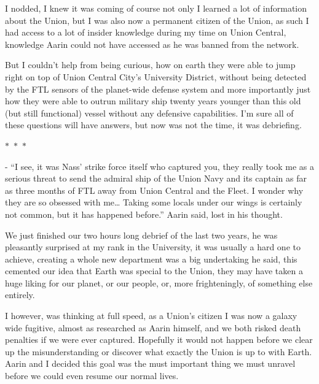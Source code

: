\documentclass[colorlinks,12pt,a4paper]{book}
\newcommand\sep{\begin{center}
  \boldmath $\ast$~$\ast$~$\ast$
\end{center}}
\begin{document}
 I nodded, I knew it was coming of course not only I learned a lot of information about the Union, but I was also now a 
 permanent citizen of the Union, as such I had access to a lot of insider knowledge during my time on Union Central,
  knowledge Aarin could not have accessed as he was banned from the network. \par
  \bigskip
 
 But I couldn't help from being curious, how on earth they were able to jump right on top of Union Central City's 
 University District, without being detected by the FTL sensors of the planet-wide defense system and more importantly
  just how they were able to outrun military ship twenty years younger than this old (but still functional) vessel without
   any defensive capabilities. I'm sure all of these questions will have answers, but now was not the time, it was 
   debriefing.
 
 \sep
 
 - “I see, it was Nass' strike force itself who captured you, they really took me as a serious threat to send 
 the admiral ship of the Union Navy and its captain as far as three months of FTL away from Union Central and the Fleet. 
 I wonder why they are so obsessed with me… Taking some locals under our wings is certainly not common, but it has happened 
 before.” Aarin said, lost in his thought.\par
 \bigskip
 
 We just finished our two hours long debrief of the last two years, he was pleasantly surprised at my rank in the
  University, it was usually a hard one to achieve, creating a whole new department was a big undertaking he said,
   this cemented our idea that Earth was special to the Union, they may have taken a huge liking for our
    planet, or our people, or, more frighteningly, of something else entirely.\par
    \bigskip
 
 I however, was thinking at full speed, as a Union's citizen I was now a galaxy wide fugitive, almost as researched as 
 Aarin himself, and we both risked death penalties if we were ever captured. Hopefully it would not happen before we
  clear up the misunderstanding or discover what exactly the Union is up to with Earth. Aarin and I decided this goal
   was the must important thing we must unravel before we could even resume our normal lives.\par
   \bigskip
 
\end{document}
